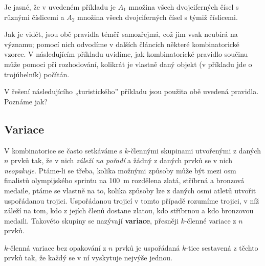       Je jasné, že v uvedeném příkladu je \(A_1\) množina všech dvojciferných čísel s různými
      číslicemi a \(A_2\) množina všech dvojciferných čísel s týmiž číslicemi. 
      
      Jak je vidět, jsou obě pravidla téměř samozřejmá, což jim vsak neubírá na významu; pomocí nich
      odvodíme v dalších článcích některé kombinatorické vzorce. V následujícím příkladu uvidíme,
      jak kombinatorické pravidlo součinu může pomoci při rozhodování, kolikrát je vlastně daný
      objekt (v příkladu jde o trojúhelník) počítán.
    
      

      V řešení následujícího „turistického” příkladu jsou použita obě uvedená pravidla. Poznáme jak?
      
      

    \subsection{Variace}\label{mai:IchapIVsecIssecII}
      V kombinatorice se často setkáváme s \(k\)-člennými skupinami utvořenými z daných \(n\) prvků
      tak, že v nich \emph{záleží na pořadí} a žádný z daných prvků se v nich \emph{neopakuje}.
      Ptáme-li se třeba, kolika možnými způsoby může být mezi osm finalistů olympijského sprintu na
      \SI{100}{\m} rozdělena zlatá, stříbrná a bronzová medaile, ptáme se vlastně na to, kolika
      způsoby lze z daných osmi atletů utvořit uspořádanou trojici. Uspořádanou trojicí v tomto
      případě rozumíme trojici, v níž záleží na tom, kdo z jejích členů dostane zlatou, kdo
      stříbrnou a kdo bronzovou medaili. Takovéto skupiny se nazývají \textbf{variace}, přesněji
      \(k\)-členné variace z \(n\) prvků.

      \begin{mdframed}[style=highlight]      
        \(k\)-členná variace bez opakování z \(n\) prvků je uspořádaná \(k\)-tice sestavená z těchto
        prvků tak, že každý se v ní vyskytuje nejvýše jednou.
      \end{mdframed}
      
